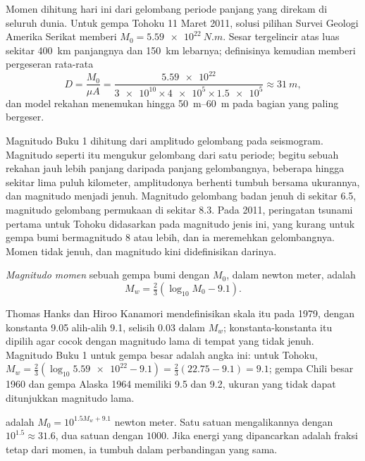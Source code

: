 Momen dihitung hari ini dari gelombang periode panjang yang direkam di seluruh dunia. Untuk gempa Tohoku 11 Maret 2011, solusi pilihan Survei Geologi Amerika Serikat memberi $M_0 = \qty{5.59e22}{N.m}$. Sesar tergelincir atas luas sekitar \qty{400}{km} panjangnya dan \qty{150}{km} lebarnya; definisinya kemudian memberi pergeseran rata-rata
\[
  D = \frac{M_0}{\mu A}
    = \frac{\num{5.59e22}}{\num{3e10}\times\num{4e5}\times\num{1.5e5}}
    \approx \qty{31}{m} ,
\]
dan model rekahan menemukan hingga \qtyrange{50}{60}{m} pada bagian yang paling bergeser.

Magnitudo Buku 1 dihitung dari amplitudo gelombang pada seismogram. Magnitudo seperti itu mengukur gelombang dari satu periode; begitu sebuah rekahan jauh lebih panjang daripada panjang gelombangnya, beberapa hingga sekitar lima puluh kilometer, amplitudonya berhenti tumbuh bersama ukurannya, dan magnitudo menjadi jenuh. Magnitudo gelombang badan jenuh di sekitar 6.5, magnitudo gelombang permukaan di sekitar 8.3. Pada 2011, peringatan tsunami pertama untuk Tohoku didasarkan pada magnitudo jenis ini, yang kurang untuk gempa bumi bermagnitudo 8 atau lebih, dan ia meremehkan gelombangnya. Momen tidak jenuh, dan magnitudo kini didefinisikan darinya.

\begin{definition}\label{def:b1:earthquake-source:mw}
\emph{Magnitudo momen} sebuah gempa bumi dengan  $M_0$, dalam newton meter, adalah
\[
  M_w = \tfrac23\left(\log_{10} M_0 - 9.1\right) .
\]
\end{definition}

Thomas Hanks dan Hiroo Kanamori mendefinisikan skala itu pada 1979, dengan konstanta 9.05 alih-alih 9.1, selisih 0.03 dalam $M_w$; konstanta-konstanta itu dipilih agar cocok dengan magnitudo lama di tempat yang tidak jenuh. Magnitudo Buku 1 untuk gempa besar adalah angka ini: untuk Tohoku,
$M_w = \tfrac23(\log_{10}\num{5.59e22} - 9.1) = \tfrac23(22.75 - 9.1) = 9.1$;
gempa Chili besar 1960 dan gempa Alaska 1964 memiliki  9.5 dan 9.2, ukuran yang tidak dapat ditunjukkan magnitudo lama.

\begin{proposition}\label{prop:b1:earthquake-source:moment-steps}
 adalah $M_0 = 10^{1.5 M_w + 9.1}$ newton meter. Satu satuan  mengalikannya dengan $10^{1.5} \approx 31.6$, dua satuan dengan $1000$. Jika energi yang dipancarkan adalah fraksi tetap dari momen, ia tumbuh dalam perbandingan yang sama.
\end{proposition}

